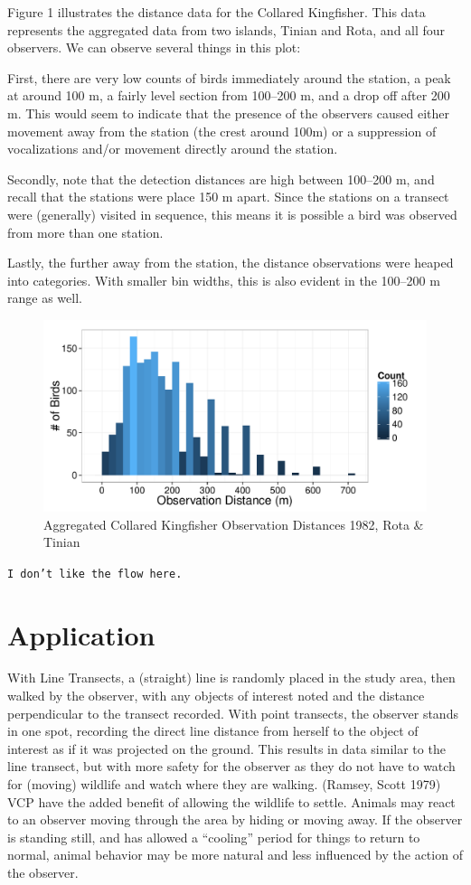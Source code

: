 \documentclass[12pt]{article}
\begin{document}
Figure 1 illustrates the distance data for the Collared Kingfisher. This data represents the aggregated data from two islands, Tinian and Rota, and all four observers. We can observe several things in this plot:

First, there are very low counts of birds immediately around the station, a peak at around 100 m, a fairly level section from 100--200 m, and a drop off after 200 m. This would seem to indicate that the presence of the observers caused either movement away from the station (the crest around 100m) or a suppression of vocalizations and/or movement directly around the station. 

Secondly, note that the detection distances are high between 100--200 m, and recall that the stations were place 150 m apart. Since the stations on a transect were (generally) visited in sequence, this means it is possible a bird was observed from more than one station. 

Lastly, the further away from the station, the distance observations were heaped into categories. With smaller bin widths, this is also evident in the 100--200 m range as well.



\begin{figure}
\caption{Aggregated Collared Kingfisher Observation Distances 1982, Rota \& Tinian}
\includegraphics[width=\textwidth]{../images/histogram_distance.pdf}
\end{figure}

\texttt{I don't like the flow here.}
\section{Application}
With Line Transects, a (straight) line is randomly placed in the study area, then walked by the observer, with any objects of interest noted and the distance perpendicular to the transect recorded. With point transects, the observer stands in one spot, recording the direct line distance from herself to the object of interest as if it was projected on the ground. This results in data similar to the line transect, but with more safety for the observer as they do not have to watch for (moving) wildlife and watch where they are walking. (Ramsey, Scott 1979) VCP have the added benefit of allowing the wildlife to settle. Animals may react to an observer moving through the area by hiding or moving away. If the observer is standing still, and has allowed a ``cooling'' period for things to return to normal, animal behavior may be more natural and less influenced by the action of the observer.
\end{document}
